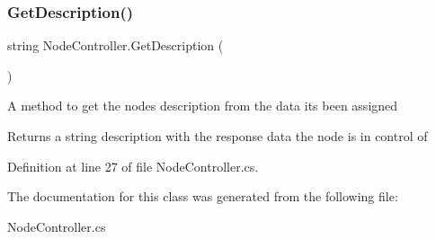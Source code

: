 \subsubsection{\texorpdfstring{Get\+Description()}{GetDescription()}}
{\footnotesize\ttfamily string Node\+Controller.\+Get\+Description (\begin{DoxyParamCaption}{ }\end{DoxyParamCaption})}



A method to get the node\textquotesingle{}s description from the data its been assigned 

\begin{DoxyReturn}{Returns}
a string description with the response data the node is in control of 
\end{DoxyReturn}


Definition at line 27 of file Node\+Controller.\+cs.



The documentation for this class was generated from the following file\+:\begin{DoxyCompactItemize}
\item 
Node\+Controller.\+cs\end{DoxyCompactItemize}
